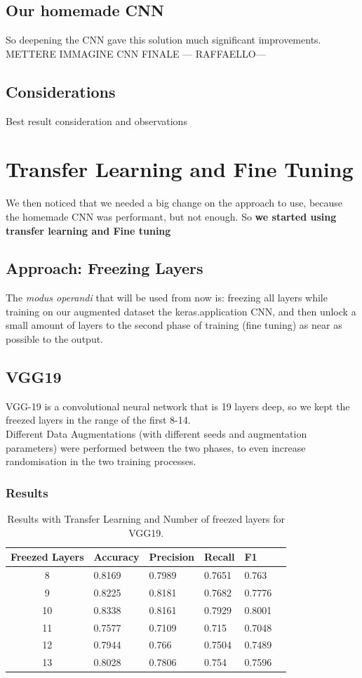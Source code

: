 \documentclass[10pt]{article}
\begin{document}
\subsection{Our homemade CNN}
So deepening the CNN gave this solution much significant improvements.\\
METTERE IMMAGINE CNN FINALE
--- RAFFAELLO---


\subsection{Considerations}
Best result consideration and observations
\section{Transfer Learning and Fine Tuning}
We then noticed that we needed a big change on the approach to use, because the homemade
CNN was performant, but not enough. So \textbf{we started using transfer learning and Fine tuning}

\subsection{Approach: Freezing Layers}
The \textit{modus operandi} that will be used from now is: freezing all layers while training on our augmented dataset the keras.application
CNN, and then unlock a small amount of layers to the second phase of training (fine tuning) as near as possible to the output.
\subsection{VGG19}
VGG-19 is a convolutional neural network that is 19 layers deep, so we kept the freezed layers in the range of the first 8-14.\\
Different Data Augmentations (with different seeds and augmentation parameters) were performed between the two phases,
to even increase randomisation in the two training processes.
\subsubsection{Results}
\begin{table}[ht]
\centering
\begin{adjustbox}{width=240}
\small
\begin{tabular}{|c|l|l|l|l|l}

\hline \bf Freezed Layers & \bf Accuracy & \bf Precision & \bf Recall & \bf F1 \\ \hline
8 & 0.8169 & 0.7989 & 0.7651 & 0.763\\
9 & 0.8225 & 0.8181 & 0.7682 & 0.7776\\
10 & 0.8338 & 0.8161 & 0.7929 & 0.8001\\
11 & 0.7577 & 0.7109 & 0.715 & 0.7048\\
12 & 0.7944 & 0.766 & 0.7504 & 0.7489\\
13 & 0.8028 & 0.7806 & 0.754 & 0.7596\\
\hline
\end{tabular}
\end{adjustbox}
\caption{Results with Transfer Learning and Number of freezed layers for VGG19.}
\end{table}
\end{document}
